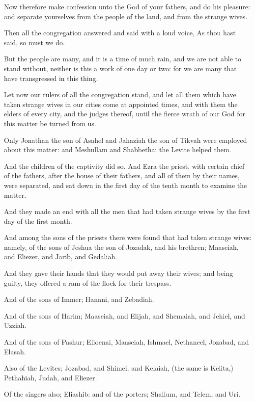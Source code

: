 \verse Now therefore make confession unto the \LORD God of your fathers, and do his pleasure: and separate yourselves from the people of the land, and from the strange wives.

\verse Then all the congregation answered and said with a loud voice, As thou hast said, so must we do.

\verse But the people are many, and it is a time of much rain, and we are not able to stand without, neither is this a work of one day or two: for we are many that have transgressed in this thing.

\verse Let now our rulers of all the congregation stand, and let all them which have taken strange wives in our cities come at appointed times, and with them the elders of every city, and the judges thereof, until the fierce wrath of our God for this matter be turned from us.

\verse Only Jonathan the son of Asahel and Jahaziah the son of Tikvah were employed about this matter: and Meshullam and Shabbethai the Levite helped them.

\verse And the children of the captivity did so. And Ezra the priest, with certain chief of the fathers, after the house of their fathers, and all of them by their names, were separated, and sat down in the first day of the tenth month to examine the matter.

\verse And they made an end with all the men that had taken strange wives by the first day of the first month.

\verse And among the sons of the priests there were found that had taken strange wives: namely, of the sons of Jeshua the son of Jozadak, and his brethren; Maaseiah, and Eliezer, and Jarib, and Gedaliah.

\verse And they gave their hands that they would put away their wives; and being guilty, they offered a ram of the flock for their trespass.

\verse And of the sons of Immer; Hanani, and Zebadiah.

\verse And of the sons of Harim; Maaseiah, and Elijah, and Shemaiah, and Jehiel, and Uzziah.

\verse And of the sons of Pashur; Elioenai, Maaseiah, Ishmael, Nethaneel, Jozabad, and Elasah.

\verse Also of the Levites; Jozabad, and Shimei, and Kelaiah, (the same is Kelita,) Pethahiah, Judah, and Eliezer.

\verse Of the singers also; Eliashib: and of the porters; Shallum, and Telem, and Uri.

